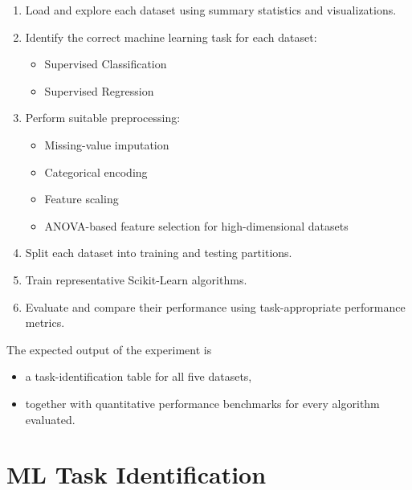 \documentclass[12pt,a4paper]{article}
\begin{document}
\begin{enumerate}[label=\textbf{(\roman*)}]
\item Load and explore each dataset using summary statistics and
visualizations.

\item Identify the correct machine learning task for each dataset:

\begin{itemize}
    \item Supervised Classification
    \item Supervised Regression
\end{itemize}

\item Perform suitable preprocessing:

\begin{itemize}
    \item Missing-value imputation
    \item Categorical encoding
    \item Feature scaling
    \item ANOVA-based feature selection for high-dimensional datasets
\end{itemize}

\item Split each dataset into training and testing partitions.

\item Train representative Scikit-Learn algorithms.

\item Evaluate and compare their performance using task-appropriate
performance metrics.
\end{enumerate}

The expected output of the experiment is

\begin{itemize}
    \item a task-identification table for all five datasets,
    \item together with quantitative performance benchmarks for every
    algorithm evaluated.
\end{itemize}

\section{ML Task Identification}
\end{document}

